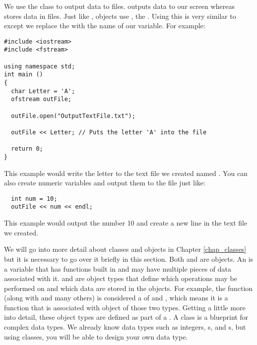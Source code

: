 We use the  class to output data to files. 
 outputs data to our screen whereas  stores data in files. 
Just like ,  objects use \Code{<<}, the . 
Using this is very similar to  except we replace the  with the name of our variable. 
For example:

\begin{lstlisting}		
#include <iostream> 
#include <fstream>
		
using namespace std;
int main ()
{
  char Letter = 'A';
  ofstream outFile;

  outFile.open("OutputTextFile.txt");

  outFile << Letter; // Puts the letter 'A' into the file

  return 0;
}
\end{lstlisting}

This example would write the letter  to the text file we created named . 
You can also create numeric variables and output them to the file just like:
			
\begin{lstlisting}
  int num = 10;
  outFile << num << endl;
\end{lstlisting}		

This example would output the number 10 and create a new line in the text file we created. 

	
We will go into more detail about classes and objects in Chapter \ref{chap_classes} but it is necessary to go over it briefly in this section. 
Both  and  are objects. 
An  is a variable that has functions built in and may have multiple pieces of data associated with it. 
 and  are object types that define which operations may be performed on and which data are stored in the objects. 
For example, the function  (along with  and many others) is considered a  of  and , which means it is a function that is associated with object of those two types. 
Getting a little more into detail, these object types are defined as part of a . 
A class is a blueprint for complex data types. 
We already know data types such as integers, s, and s, but using classes, you will be able to design your own data type.

